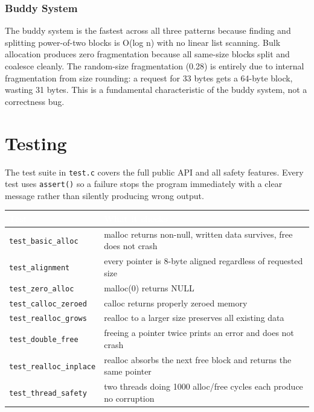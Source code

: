 \documentclass[12pt, a4paper]{report}
\begin{document}
\subsection{Buddy System}

The buddy system is the fastest across all three patterns because finding and
splitting power-of-two blocks is O(log n) with no linear list scanning. Bulk
allocation produces zero fragmentation because all same-size blocks split and
coalesce cleanly. The random-size fragmentation (0.28) is entirely due to
internal fragmentation from size rounding: a request for 33 bytes gets a 64-byte
block, wasting 31 bytes. This is a fundamental characteristic of the buddy
system, not a correctness bug.

\chapter{Testing}

The test suite in \texttt{test.c} covers the full public API and all safety
features. Every test uses \texttt{assert()} so a failure stops the program
immediately with a clear message rather than silently producing wrong output.

\begin{center}
\begin{tabular}{L{4.2cm} L{8.8cm}}
\toprule
{}
\textcolor{white}{\textbf{Test}} &
\textcolor{white}{\textbf{What it checks}} \\
\midrule
\texttt{test\_basic\_alloc}     & malloc returns non-null, written data survives, free does not crash \\
\texttt{test\_alignment}        & every pointer is 8-byte aligned regardless of requested size \\
\texttt{test\_zero\_alloc}      & malloc(0) returns NULL \\
\texttt{test\_calloc\_zeroed}   & calloc returns properly zeroed memory \\
\texttt{test\_realloc\_grows}   & realloc to a larger size preserves all existing data \\
\texttt{test\_double\_free}     & freeing a pointer twice prints an error and does not crash \\
\texttt{test\_realloc\_inplace} & realloc absorbs the next free block and returns the same pointer \\
\texttt{test\_thread\_safety}   & two threads doing 1000 alloc/free cycles each produce no corruption \\
\bottomrule
\end{tabular}
\end{center}
\end{document}
